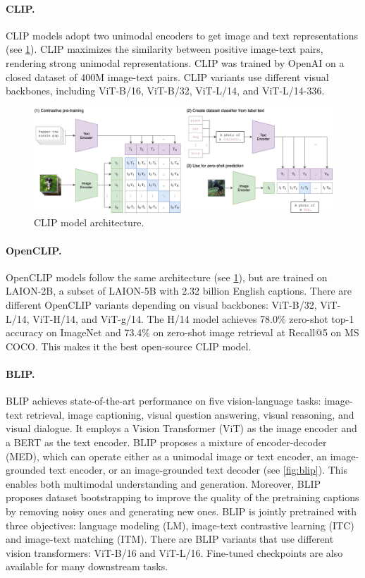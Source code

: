 \paragraph{CLIP.} CLIP \cite{radford2021clip} models adopt two
unimodal encoders to get image and text representations (see \cref{fig:clip}). CLIP maximizes the similarity between positive image-text pairs, rendering strong unimodal representations. CLIP was trained by OpenAI on a closed dataset of 400M image-text pairs. CLIP variants use different visual backbones, including ViT-B/16, ViT-B/32, ViT-L/14, and ViT-L/14-336.

\begin{figure}[ht]
    \centering
    \includegraphics[width=\linewidth]{images/models/clip.png}
    \caption{CLIP model architecture.}
    \label{fig:clip}
\end{figure}

\paragraph{OpenCLIP.} OpenCLIP \cite{ilharco_gabriel_2021_5143773} models follow the same architecture (see \cref{fig:clip}), but are trained on LAION-2B, a subset of LAION-5B \cite{schuhmann2022laionb} with 2.32 billion English captions. There are different OpenCLIP variants depending on visual backbones: ViT-B/32, ViT-L/14, ViT-H/14, and ViT-g/14. The H/14 model achieves 78.0\% zero-shot top-1 accuracy on ImageNet and 73.4\% on zero-shot image retrieval at Recall@5 on MS COCO. This makes it the best open-source CLIP model.

\paragraph{BLIP.} BLIP \cite{li2022blip} achieves state-of-the-art performance on five vision-language tasks: image-text retrieval, image captioning, visual question answering, visual reasoning, and visual dialogue. It employs a Vision Transformer (ViT) \cite{dosovitskiy2020imageworth} as the image encoder and a BERT as the text encoder. BLIP proposes a mixture of encoder-decoder (MED), which can operate either as a unimodal image or text encoder, an image-grounded text encoder, or an image-grounded text decoder (see \cref{fig:blip}). This enables both multimodal understanding and generation. Moreover, BLIP proposes dataset bootstrapping to improve the quality of the pretraining captions by removing noisy ones and generating new ones. BLIP is jointly pretrained with three objectives: language modeling (LM), image-text contrastive learning (ITC) and image-text matching (ITM). There are BLIP variants that use different vision transformers: ViT-B/16 and ViT-L/16. Fine-tuned checkpoints are also available for many downstream tasks.


